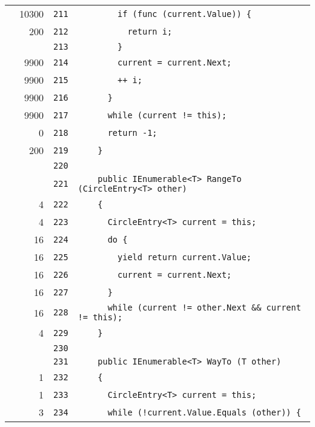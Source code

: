 \documentclass[a4paper,10pt]{article}
\begin{document}
\begin{longtable}[l]{lrrl}
\cellcolor{green} & 10300 & \verb~211~ & \verb~        if (func (current.Value)) {~\\
\cellcolor{green} & 200 & \verb~212~ & \verb~          return i;~\\
\cellcolor{gray} &  & \verb~213~ & \verb~        }~\\
\cellcolor{green} & 9900 & \verb~214~ & \verb~        current = current.Next;~\\
\cellcolor{green} & 9900 & \verb~215~ & \verb~        ++ i;~\\
\cellcolor{green} & 9900 & \verb~216~ & \verb~      }~\\
\cellcolor{green} & 9900 & \verb~217~ & \verb~      while (current != this);~\\
\cellcolor{red} & 0 & \verb~218~ & \verb~      return -1;~\\
\cellcolor{green} & 200 & \verb~219~ & \verb~    }~\\
\cellcolor{gray} &  & \verb~220~ & \verb~~\\
\cellcolor{gray} &  & \verb~221~ & \verb~    public IEnumerable<T> RangeTo (CircleEntry<T> other)~\\
\cellcolor{green} & 4 & \verb~222~ & \verb~    {~\\
\cellcolor{green} & 4 & \verb~223~ & \verb~      CircleEntry<T> current = this;~\\
\cellcolor{green} & 16 & \verb~224~ & \verb~      do {~\\
\cellcolor{green} & 16 & \verb~225~ & \verb~        yield return current.Value;~\\
\cellcolor{green} & 16 & \verb~226~ & \verb~        current = current.Next;~\\
\cellcolor{green} & 16 & \verb~227~ & \verb~      }~\\
\cellcolor{green} & 16 & \verb~228~ & \verb~      while (current != other.Next && current != this);~\\
\cellcolor{green} & 4 & \verb~229~ & \verb~    }~\\
\cellcolor{gray} &  & \verb~230~ & \verb~~\\
\cellcolor{gray} &  & \verb~231~ & \verb~    public IEnumerable<T> WayTo (T other)~\\
\cellcolor{green} & 1 & \verb~232~ & \verb~    {~\\
\cellcolor{green} & 1 & \verb~233~ & \verb~      CircleEntry<T> current = this;~\\
\cellcolor{green} & 3 & \verb~234~ & \verb~      while (!current.Value.Equals (other)) {~\\

\end{longtable}
\end{document}
